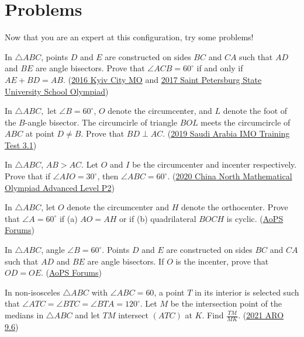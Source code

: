 \documentclass[11pt]{scrartcl}
\begin{document}
\section{Problems}
Now that you are an expert at this configuration, try some problems!


\begin{enumerate}
	\ii In $\triangle ABC$, points $D$ and $E$ are constructed on sides $BC$ and $CA$ such that $AD$ and $BE$ are angle bisectors. Prove that $\angle ACB = 60^\circ$ if and only if $AE + BD = AB$. (\href{https://artofproblemsolving.com/community/c4h2260732p17495718}{2016 Kyiv City MO} and \href{https://artofproblemsolving.com/community/c6h2402244p19698819}{2017 Saint Petersburg State University School Olympiad})
    

    
    
	\ii In $\triangle ABC,$ let $\angle B = 60^\circ$, $O$ denote the circumcenter, and $L$ denote the foot of the $B$-angle bisector. The circumcirle of triangle $BOL$ meets the circumcircle of $ABC$ at point $D \ne B$. Prove that $BD \perp AC$. (\href{https://artofproblemsolving.com/community/c6h2259561p17475948}{2019 Saudi Arabia IMO Training Test 3.1})

    
    
    
	\ii In $\triangle ABC$, $AB>AC$. Let $O$ and $I$ be the circumcenter and incenter respectively. Prove that if $\angle AIO = 30^{\circ}$, then $\angle ABC = 60^{\circ}$. (\href{https://artofproblemsolving.com/community/c6h2220657p16878510}{2020 China North Mathematical Olympiad Advanced Level P2})
    
    
	\ii In $\triangle ABC$, let $O$ denote the circumcenter and $H$ denote the orthocenter. Prove that $\angle A=60^\circ$ if (a) $AO=AH$ or if (b) quadrilateral $BOCH$ is cyclic. (\href{https://artofproblemsolving.com/community/c4h2060529p14687121}{AoPS Forums})
    
    
	\ii In $\triangle ABC$, angle $\angle B=60^\circ$. Points $D$ and $E$ are constructed on sides $BC$ and $CA$ such that $AD$ and $BE$ are angle bisectors. If $O$ is the incenter, prove that $OD=OE$. (\href{https://artofproblemsolving.com/community/c4h2133091p15607072}{AoPS Forums})
    
    
    
	\ii In non-isosceles $\triangle ABC$ with $\angle ABC=60$, a point $T$ in its interior is selected such that $\angle ATC=\angle BTC=\angle BTA=120^\circ$. Let $M$ be the intersection point of the medians in $\triangle ABC$ and let $TM$ intersect $(ATC)$ at $K$. Find $\frac{TM}{MK}$. (\href{https://artofproblemsolving.com/community/c6h2535040}{2021 ARO 9.6})
    

\end{enumerate}
\end{document}
